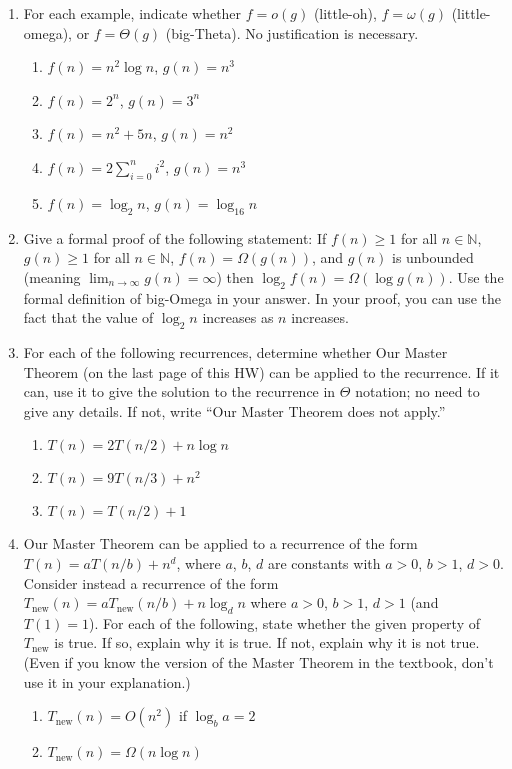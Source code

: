 \documentclass{article}
\begin{document}
\begin{enumerate}
    \item For each example, indicate whether $f = o(g)$ (little-oh), $f = \omega(g)$ (little-omega), or $f = \Theta(g)$ (big-Theta). No justification is necessary.
    \begin{enumerate}
        \item $f(n) = n^2 \log n$, $g(n) = n^3$
        \item $f(n) = 2^n$, $g(n) = 3^n$
        \item $f(n) = n^2 + 5n$, $g(n) = n^2$
        \item $f(n) = 2 \sum_{i=0}^n i^2$, $g(n) = n^3$
        \item $f(n) = \log_2 n$, $g(n) = \log_{16} n$
    \end{enumerate}

    \item Give a formal proof of the following statement: If $f(n) \ge 1$ for all $n \in \mathbb{N}$, $g(n) \ge 1$ for all $n \in \mathbb{N}$, $f(n) = \Omega(g(n))$, and $g(n)$ is unbounded (meaning $\lim_{n \to \infty} g(n) = \infty$) then $\log_2 f(n) = \Omega(\log g(n))$. Use the formal definition of big-Omega in your answer. In your proof, you can use the fact that the value of $\log_2 n$ increases as $n$ increases.

    \item For each of the following recurrences, determine whether Our Master Theorem (on the last page of this HW) can be applied to the recurrence. If it can, use it to give the solution to the recurrence in $\Theta$ notation; no need to give any details. If not, write “Our Master Theorem does not apply.”
    \begin{enumerate}
        \item $T(n) = 2T(n/2) + n \log n$
        \item $T(n) = 9T(n/3) + n^2$
        \item $T(n) = T(n/2) + 1$
    \end{enumerate}

    \item Our Master Theorem can be applied to a recurrence of the form $T(n) = aT(n/b) + n^d$, where $a$, $b$, $d$ are constants with $a > 0$, $b > 1$, $d > 0$. Consider instead a recurrence of the form $T_{\text{new}}(n) = aT_{\text{new}}(n/b) + n \log_d n$ where $a > 0$, $b > 1$, $d > 1$ (and $T(1) = 1$). For each of the following, state whether the given property of $T_{\text{new}}$ is true. If so, explain why it is true. If not, explain why it is not true. (Even if you know the version of the Master Theorem in the textbook, don’t use it in your explanation.)
    \begin{enumerate}
        \item $T_{\text{new}}(n) = O(n^2)$ if $\log_b a = 2$
        \item $T_{\text{new}}(n) = \Omega(n \log n)$
    \end{enumerate}


\end{enumerate}
\end{document}

